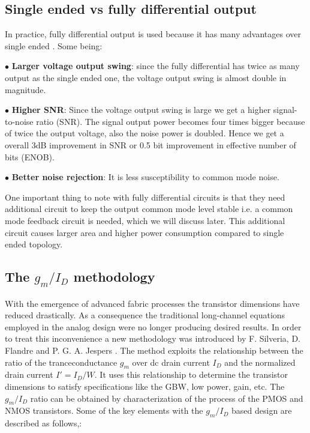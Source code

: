 \subsection{Single ended vs fully differential output }
In practice, fully differential output is used because it has many advantages over single ended \cite{Johns}. Some being:

$\bullet$ \textbf{Larger voltage output swing}: since the fully differential has twice as many output as the single ended one, the voltage output swing is almost double in magnitude. 

$\bullet$ \textbf{Higher SNR}: Since the voltage output swing is large we get a higher signal-to-noise ratio (SNR). The signal output power becomes four times bigger because of twice the output voltage, also the noise power is doubled. Hence we get a overall 3dB improvement in SNR or 0.5 bit improvement in effective number of bits (ENOB).

$\bullet$ \textbf{Better noise rejection}: It is less susceptibility to common mode noise.

One important thing to note with fully differential circuits is that they need additional circuit to keep the output common mode level stable i.e. a common mode feedback circuit is needed, which we will discuss later. This additional circuit causes larger area and higher power consumption compared to single ended topology\cite{Allen}. 

\subsection{The $g_m/I_D$ methodology}

With the emergence of advanced fabric processes the transistor dimensions have reduced drastically. As a consequence the traditional long-channel equations employed in the analog design were no longer producing desired results. In order to treat this inconvenience a new methodology was introduced by F. Silveria, D. Flandre and P. G. A. Jespers \cite{gm_id_1}. The method exploits the relationship between the ratio of the tranceconductance $g_m$ over dc drain current $I_D$ and the normalized drain current $I' = I_D/W$. It uses this relationship to determine the transistor dimensions to satisfy specifications like the GBW, low power, gain, etc. The $g_m/I_D$ ratio can be obtained by characterization of the process of the PMOS and NMOS transistors. Some of the key elements with the $g_m/I_D$  based design are described as follows\cite{gm_id_1},\cite{gm_id_2}:

